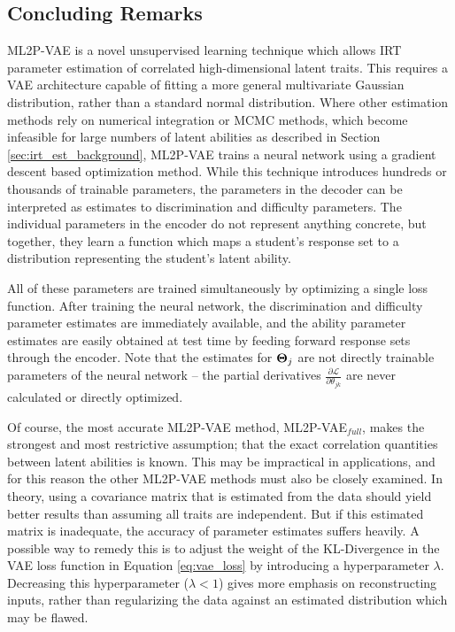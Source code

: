\subsection{Concluding Remarks}
ML2P-VAE is a novel unsupervised learning technique which allows IRT parameter estimation of correlated high-dimensional latent traits. This requires a VAE architecture capable of fitting a more general multivariate Gaussian distribution, rather than a standard normal distribution. Where other estimation methods rely on numerical integration or MCMC methods, which become infeasible for large numbers of latent abilities as described in Section \ref{sec:irt_est_background}, ML2P-VAE trains a neural network using a gradient descent based optimization method. While this technique introduces hundreds or thousands of trainable parameters, the parameters in the decoder can be interpreted as estimates to discrimination and difficulty parameters. The individual parameters in the encoder do not represent anything concrete, but together, they learn a function which maps a student's response set to a distribution representing the student's latent ability.

All of these parameters are trained simultaneously by optimizing a single loss function. After training the neural network, the discrimination and difficulty parameter estimates are immediately available, and the ability parameter estimates are easily obtained at test time by feeding forward response sets through the encoder. Note that the estimates for $\boldsymbol{\Theta}_j$ are not directly trainable parameters of the neural network -- the partial derivatives $\frac{\partial \mathcal{L}}{\partial \theta_{jk}}$ are never calculated or directly optimized.

Of course, the most accurate ML2P-VAE method, ML2P-VAE$_{full}$, makes the strongest and most restrictive assumption; that the exact correlation quantities between latent abilities is known. This may be impractical in applications, and for this reason the other ML2P-VAE methods must also be closely examined. In theory, using a covariance matrix that is estimated from the data should yield better results than assuming all traits are independent. But if this estimated matrix is inadequate, the accuracy of parameter estimates suffers heavily. A possible way to remedy this is to adjust the weight of the KL-Divergence in the VAE loss function in Equation \ref{eq:vae_loss} by introducing a hyperparameter $\lambda$. Decreasing this hyperparameter ($\lambda < 1$) gives more emphasis on reconstructing inputs, rather than regularizing the data against an estimated distribution which may be flawed.

